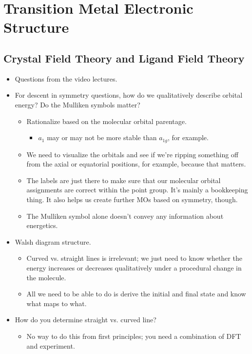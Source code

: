 \documentclass[../notes.tex]{subfiles}
\begin{document}
\chapter{Transition Metal Electronic Structure}
\section{Crystal Field Theory and Ligand Field Theory}
\begin{itemize}
    \item {}Questions from the video lectures.
    \item For descent in symmetry questions, how do we qualitatively describe orbital energy? Do the Mulliken symbols matter?
    \begin{itemize}
        \item Rationalize based on the molecular orbital parentage.
        \begin{itemize}
            \item $a_1$ may or may not be more stable than $a_{1g}$, for example.
        \end{itemize}
        \item We need to visualize the orbitals and see if we're ripping something off from the axial or equatorial positions, for example, because that matters.
        \item The labels are just there to make sure that our molecular orbital assignments are correct within the point group. It's mainly a bookkeeping thing. It also helps us create further MOs based on symmetry, though.
        \item The Mulliken symbol alone doesn't convey any information about energetics.
    \end{itemize}
    \item Walsh diagram structure.
    \begin{itemize}
        \item Curved vs. straight lines is irrelevant; we just need to know whether the energy increases or decreases qualitatively under a procedural change in the molecule.
        \item All we need to be able to do is derive the initial and final state and know what maps to what.
    \end{itemize}
    \item How do you determine straight vs. curved line?
    \begin{itemize}
        \item No way to do this from first principles; you need a combination of DFT and experiment.

\end{itemize}
\end{itemize}
\end{document}

